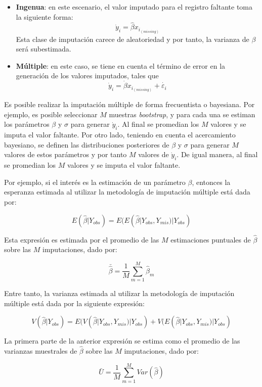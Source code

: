 \documentclass[
  12pt,
  spanish,
]{book}
\providecommand{\tightlist}{%
  \setlength{\itemsep}{0pt}\setlength{\parskip}{0pt}}
\begin{document}
\begin{itemize}
\tightlist
\item
  \textbf{Ingenua}: en este escenario, el valor imputado para el registro faltante toma la siguiente forma:
  \[
  \dot{y}_i = \hat\beta x_{i_{(missing)}}
  \]
  Esta clase de imputación carece de aleatoriedad y por tanto, la varianza de \(\beta\) será subestimada.
\item
  \textbf{Múltiple}: en este caso, se tiene en cuenta el término de error en la generación de los valores imputados, tales que
  \[
  \dot{y}_i = \dot{\beta} x_{i_{(missing)}}+ \dot{\varepsilon_i}
  \]
\end{itemize}

Es posible realizar la imputación múltiple de forma frecuentista o bayesiana. Por ejemplo, es posible seleccionar \(M\) muestras \emph{bootstrap}, y para cada una se estiman los parámetros \(\beta\) y \(\sigma\) para generar \(\dot{y}_i\). Al final se promedian los \(M\) valores y se imputa el valor faltante. Por otro lado, teniendo en cuenta el acercamiento bayesiano, se definen las distribuciones posteriores de \(\beta\) y \(\sigma\) para generar \(M\) valores de estos parámetros y por tanto \(M\) valores de \(\dot{y}_i\). De igual manera, al final se promedian los \(M\) valores y se imputa el valor faltante.

Por ejemplo, si el interés es la estimación de un parámetro \(\beta\), entonces la esperanza estimada al utilizar la metodología de imputación múltiple está dada por:

\[
E(\hat{\beta} | Y_{obs}) = E(E(\hat{\beta} | Y_{obs}, Y_{mis}) | Y_{obs})
\]

Esta expresión es estimada por el promedio de las \(M\) estimaciones puntuales de \(\hat{\beta}\) sobre las \(M\) imputaciones, dado por:

\[
\bar{\hat{\beta}} = \frac{1}{M} \sum_{m = 1} ^ M \hat{\beta}_m
\]

Entre tanto, la varianza estimada al utilizar la metodología de imputación múltiple está dada por la siguiente expresión:

\[
V(\hat{\beta} | Y_{obs}) = E(V(\hat{\beta} | Y_{obs}, Y_{mis}) | Y_{obs}) +
V(E(\hat{\beta} | Y_{obs}, Y_{mis}) | Y_{obs}) 
\]

La primera parte de la anterior expresión se estima como el promedio de las varianzas muestrales de \(\hat{\beta}\) sobre las \(M\) imputaciones, dado por:

\[
\bar{U} = \frac{1}{M} \sum_{m = 1} ^ M Var(\hat{\beta})
\]
\end{document}
